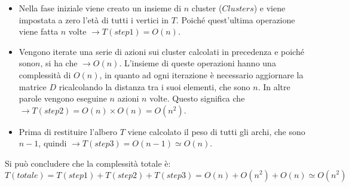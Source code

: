 \begin{itemize}
	\item Nella fase iniziale viene creato un insieme di $n$ cluster ($Clusters$) e viene impostata a zero l'età di tutti i vertici in $T$. Poiché quest'ultima operazione viene fatta $n$ volte $\rightarrow T(step1)=O(n)$.
	\item Vengono iterate una serie di azioni sui cluster calcolati in precedenza e poiché sono$n$, si ha che $ \rightarrow O(n)$. L'insieme di queste operazioni hanno una complessità di $O(n)$, in quanto ad ogni iterazione è necessario aggiornare la matrice $D$ ricalcolando la distanza tra i suoi elementi, che sono $n$. In altre parole vengono eseguine $n$ azioni $n$ volte. Questo significa che $\rightarrow T(step2)=O(n) \times O(n) = O(n^2)$.
	\item Prima di restituire l'albero $T$ viene calcolato il peso di tutti gli archi, che sono $n-1$, quindi $\rightarrow T(step3)=O(n-1) \simeq O(n)$.
\end{itemize}
Si può concludere che la complessità totale è:
\[T(totale)=T(step1)+T(step2)+T(step3)=O(n)+O(n^2)+O(n)\simeq O(n^2)\]